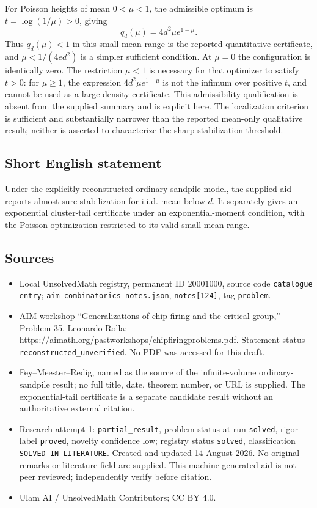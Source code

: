 \documentclass[11pt]{article}
\begin{document}
For Poisson heights of mean \(0<\mu<1\), the admissible optimum is \(t=\log(1/\mu)>0\), giving
\[
 q_d(\mu)=4d^2\mu e^{1-\mu}.
\]
Thus \(q_d(\mu)<1\) in this small-mean range is the reported quantitative certificate, and \(\mu<1/(4ed^2)\) is a simpler sufficient condition. At \(\mu=0\) the configuration is identically zero. The restriction \(\mu<1\) is necessary for that optimizer to satisfy \(t>0\): for \(\mu\ge1\), the expression \(4d^2\mu e^{1-\mu}\) is not the infimum over positive \(t\), and cannot be used as a large-density certificate. This admissibility qualification is absent from the supplied summary and is explicit here. The localization criterion is sufficient and substantially narrower than the reported mean-only qualitative result; neither is asserted to characterize the sharp stabilization threshold.
\subsection{Short English statement}
Under the explicitly reconstructed ordinary sandpile model, the supplied aid reports almost-sure stabilization for i.i.d. mean below \(d\). It separately gives an exponential cluster-tail certificate under an exponential-moment condition, with the Poisson optimization restricted to its valid small-mean range.
\subsection{Sources}
\begin{itemize}
\item Local UnsolvedMath registry, permanent ID \(20001000\), source code \texttt{catalogue entry}; \texttt{aim-combinatorics-notes.json}, \texttt{notes[124]}, tag \texttt{problem}.
\item AIM workshop ``Generalizations of chip-firing and the critical group,'' Problem 35, Leonardo Rolla: \url{https://aimath.org/pastworkshops/chipfiringproblems.pdf}. Statement status \texttt{reconstructed\_unverified}. No PDF was accessed for this draft.
\item Fey--Meester--Redig, named as the source of the infinite-volume ordinary-sandpile result; no full title, date, theorem number, or URL is supplied. The exponential-tail certificate is a separate candidate result without an authoritative external citation.
\item Research attempt 1: \texttt{partial\_result}, problem status at run \texttt{solved}, rigor label \texttt{proved}, novelty confidence low; registry status \texttt{solved}, classification \texttt{SOLVED-IN-LITERATURE}. Created and updated 14 August 2026. No original remarks or literature field are supplied. This machine-generated aid is not peer reviewed; independently verify before citation.
\item Ulam AI / UnsolvedMath Contributors; CC BY 4.0.
\end{itemize}
\end{document}
